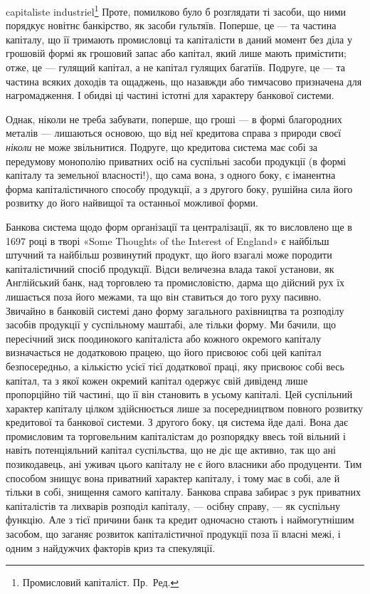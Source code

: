\parcont{}  %
capitaliste industriel\footnote*{
Промисловий капіталіст. Пр.~Ред.
} Проте, помилково було б розглядати ті засоби, що ними
порядкує новітнє банкірство, як засоби гультяїв. Поперше, це — та частина
капіталу, що її тримають промисловці та капіталісти в даний момент без діла
у грошовій формі як грошовий запас або капітал, який лише мають примістити;
отже, це — гулящий капітал, а не капітал гулящих багатіїв. Подруге, це — та
частина всяких доходів та ощаджень, що назавжди або тимчасово призначена
для нагромадження. І обидві ці частині істотні для характеру банкової системи.

Однак, ніколи не треба забувати, поперше, що гроші — в формі благородних
металів — лишаються основою, що від неї кредитова справа з природи
своєї \emph{ніколи} не може звільнитися. Подруге, що кредитова система має собі
за передумову монополію приватних осіб на суспільні засоби продукції (в формі
капіталу та земельної власності!), що сама вона, з одного боку, є іманентна
форма капіталістичного способу продукції, а з другого боку, рушійна сила його
розвитку до його найвищої та останньої можливої форми.

Банкова система щодо форм організації та централізації, як то висловлено
ще в 1697 році в творі «Some Thoughts of the Interest of England» є найбільш
штучний та найбільш розвинутий продукт, що його взагалі може породити
капіталістичний спосіб продукцїї. Відси величезна влада такої установи,
як Англійський банк, над торговлею та промисловістю, дарма що дійсний рух
їх лишається поза його межами, та що він ставиться до того руху пасивно.
Звичайно в банковій системі дано форму загального рахівництва та розподілу
засобів продукції у суспільному маштабі, але тільки форму. Ми бачили, що пересічний
зиск поодинокого капіталіста або кожного окремого капіталу визначається
не додатковою працею, що його присвоює собі цей капітал безпосередньо,
а кількістю усієї тієї додаткової праці, яку присвоює собі весь капітал, та з якої
кожен окремий капітал одержує свій дивіденд лише пропорційно тій частині, що
її він становить в усьому капіталі. Цей суспільний характер капіталу цілком
здійснюється лише за посередництвом повного розвитку кредитової та банкової
системи. З другого боку, ця система йде далі. Вона дає промисловим та торговельним
капіталістам до розпорядку ввесь той вільний і навіть потенціяльний
капітал суспільства, що не діє ще активно, так що ані позикодавець, ані уживач
цього капіталу не є його власники або продуценти. Тим способом знищує
вона приватний характер капіталу, і тому має в собі, але й тільки в собі, знищення
самого капіталу. Банкова справа забирає з рук приватних капіталістів
та лихварів розподіл капіталу, — осібну справу, — як суспільну функцію. Але
з тієї причини банк та кредит одночасно стають і наймогутнішим засобом, що
заганяє розвиток капіталістичної продукції поза її власні межі, і одним з найдужчих
факторів криз та спекуляції.

